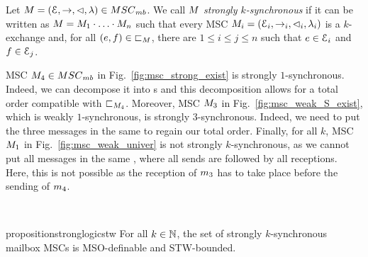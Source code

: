 \documentclass[a4paper,UKenglish,cleveref, autoref, thm-restate]{lipics-v2021}
\begin{document}
\begin{definition}\label{def:strongksync}
Let $\msc = (\Events,\procrel,\lhd,\lambda) \in \mbMSCs$.
We call $M$ \emph{strongly $k$-synchronous}
if it can be written as
$M = M_1 \cdot \ldots \cdot M_n$ %
such that every MSC $M_i = (\mathcal{E}_i,\to_i,\lhd_i,\lambda_i)$ is a $k$-exchange
and, for all $(e,f) \in {\sqsubset}_M$, there are $1 \le i \le j \le n$
such that $e \in \mathcal{E}_i$ and $f \in \mathcal{E}_j$.
\end{definition}

\smallskip

\noindent\begin{minipage}[c]{10.5cm}
	\begin{example}
	MSC $\mscstrongexist \in \mbMSCs$ in Fig.~\ref{fig:msc_strong_exist}
is
	strongly $1$-synchronous. Indeed, we can decompose it into s and this
	decomposition allows for a total order compatible with $\sqsubset_{M_4}$.
	Moreover, MSC $M_{3}$ in Fig.~\ref{fig:msc_weak_S_exist}, which is
	weakly $1$-synchronous, is strongly $3$-synchronous. Indeed, we need
	to put the three messages in the same  to regain our total order.
	Finally, for all $k$, MSC $M_{1}$ in Fig.~\ref{fig:msc_weak_univer} is not
	strongly $k$-synchronous, as we cannot put all messages in the same ,
	where all sends are followed by all receptions.  Here, this is not possible as the reception of $m_3$ has to take place before the sending of
$m_4$.

\end{example}
\end{minipage}~~
\begin{minipage}[c]{3cm}
	
\end{minipage}

\smallskip

\begin{restatable}{proposition}{stronglogicstw}
	\label{prop:strong-logic-bounded}
For all $k \in \mathbb{N}$, the set of strongly $k$-synchronous mailbox MSCs
is MSO-definable and STW-bounded.%
\end{restatable}
\end{document}
